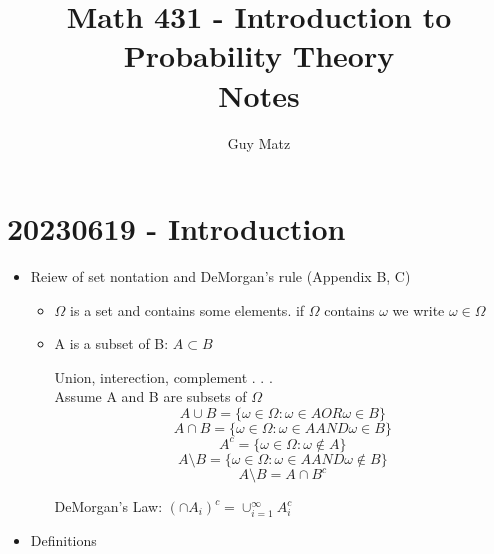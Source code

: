 \documentclass{report}
\title{
  \Huge{Math 431 - Introduction to Probability Theory}
  \\
  Notes
}
\author{\huge{Guy Matz}}
\date{}
\begin{document}

\chapter*{20230619 - Introduction}

\begin{itemize}
  \item Reiew of set nontation and DeMorgan's rule (Appendix B, C)

    \begin{itemize}

    \item $\Omega$ is a set and contains some elements.  if $\Omega$
      contains $\omega$ we write $\omega \in \Omega$

    \item A is a subset of B: $A \subset B$

    Union, interection, complement . . .\\
    Assume A and B are subsets of $\Omega$
    $$A \cup B = \{ \omega \in \Omega: \omega \in A OR \omega \in B\}$$
    $$A \cap B = \{ \omega \in \Omega: \omega \in A AND \omega \in B\}$$
    $$A^c = \{ \omega \in \Omega: \omega \notin A \}$$
    $$A \setminus B=\{\omega \in \Omega:\omega \in A AND \omega \notin B\}$$
    \[ A \setminus B = A \cap B^c \]

    DeMorgan's Law: $\left( \cap A_i \right)^c = \cup^{\infty}_{i=1} A_i^c$

    \end{itemize}

  \item Definitions





  \end{itemize}
\end{document}
